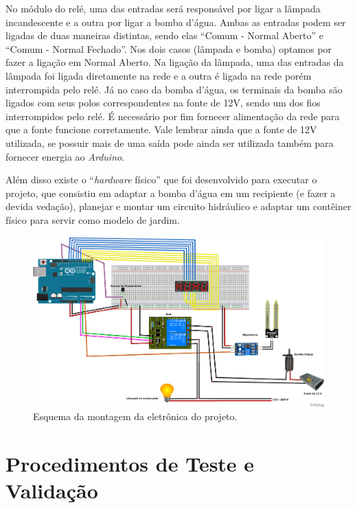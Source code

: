 \documentclass[a4paper,12pt]{article}
\begin{document}
    No módulo do relé, uma das entradas será responsável por ligar a lâmpada incandescente e a outra por ligar a bomba d’água. Ambas as entradas podem ser ligadas de duas maneiras distintas, sendo elas “Comum - Normal Aberto” e “Comum - Normal Fechado”. Nos dois casos (lâmpada e bomba) optamos por fazer a ligação em Normal Aberto. Na ligação da lâmpada, uma das entradas da lâmpada foi ligada diretamente na rede e a outra é ligada na rede porém interrompida pelo relé. Já no caso da bomba d’água, os terminais da bomba são ligados com seus polos correspondentes na fonte de 12V, sendo um dos fios interrompidos pelo relé. É necessário por fim fornecer alimentação da rede para que a fonte funcione corretamente. Vale lembrar ainda que a fonte de 12V utilizada, se possuir mais de uma saída pode ainda ser utilizada também para fornecer energia ao \textit{Arduino}.

    Além disso existe o “\textit{hardware} físico” que foi desenvolvido para executar o projeto, que consistiu em adaptar a bomba d’água em um recipiente (e fazer a devida vedação), planejar e montar um circuito hidráulico e adaptar um contêiner físico para servir como modelo de jardim.


		\begin{figure}[!ht]
		  \centering
		    \includegraphics[width=1.15\textwidth]{EsquemaEletronica.png}
		    \caption{Esquema da montagem da eletrônica do projeto.}
		\end{figure}





\section{Procedimentos de Teste e Validação}
\end{document}
